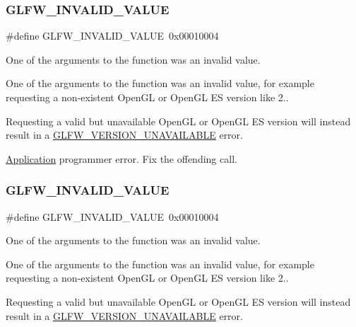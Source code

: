 \subsubsection{\texorpdfstring{G\+L\+F\+W\+\_\+\+I\+N\+V\+A\+L\+I\+D\+\_\+\+V\+A\+L\+UE}{GLFW\_INVALID\_VALUE}\hspace{0.1cm}{\footnotesize\ttfamily [2/5]}}
{\footnotesize\ttfamily \#define G\+L\+F\+W\+\_\+\+I\+N\+V\+A\+L\+I\+D\+\_\+\+V\+A\+L\+UE~0x00010004}



One of the arguments to the function was an invalid value. 

One of the arguments to the function was an invalid value, for example requesting a non-\/existent Open\+GL or Open\+GL ES version like 2..

Requesting a valid but unavailable Open\+GL or Open\+GL ES version will instead result in a \hyperlink{group__errors_gad16c5565b4a69f9c2a9ac2c0dbc89462}{G\+L\+F\+W\+\_\+\+V\+E\+R\+S\+I\+O\+N\+\_\+\+U\+N\+A\+V\+A\+I\+L\+A\+B\+LE} error.

\hyperlink{classApplication}{Application} programmer error. Fix the offending call. \mbox{\label{group__errors_gaaf2ef9aa8202c2b82ac2d921e554c687}} 
\subsubsection{\texorpdfstring{G\+L\+F\+W\+\_\+\+I\+N\+V\+A\+L\+I\+D\+\_\+\+V\+A\+L\+UE}{GLFW\_INVALID\_VALUE}\hspace{0.1cm}{\footnotesize\ttfamily [3/5]}}
{\footnotesize\ttfamily \#define G\+L\+F\+W\+\_\+\+I\+N\+V\+A\+L\+I\+D\+\_\+\+V\+A\+L\+UE~0x00010004}



One of the arguments to the function was an invalid value. 

One of the arguments to the function was an invalid value, for example requesting a non-\/existent Open\+GL or Open\+GL ES version like 2..

Requesting a valid but unavailable Open\+GL or Open\+GL ES version will instead result in a \hyperlink{group__errors_gad16c5565b4a69f9c2a9ac2c0dbc89462}{G\+L\+F\+W\+\_\+\+V\+E\+R\+S\+I\+O\+N\+\_\+\+U\+N\+A\+V\+A\+I\+L\+A\+B\+LE} error.


